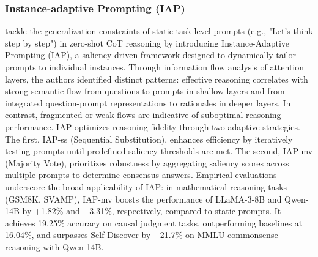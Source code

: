 \documentclass{article}
\begin{document}
\subsubsection{Instance-adaptive Prompting (IAP)}
\label{IAP}
\noindent \citet{yuan2024instanceadaptivezeroshotchainofthoughtprompting} tackle the generalization constraints of static task-level prompts (e.g., "Let’s think step by step") in zero-shot CoT reasoning by introducing Instance-Adaptive Prompting (IAP), a saliency-driven framework designed to dynamically tailor prompts to individual instances. Through information flow analysis of attention layers, the authors identified distinct patterns: effective reasoning correlates with strong semantic flow from questions to prompts in shallow layers and from integrated question-prompt representations to rationales in deeper layers. In contrast, fragmented or weak flows are indicative of suboptimal reasoning performance. IAP optimizes reasoning fidelity through two adaptive strategies. The first, IAP-ss (Sequential Substitution), enhances efficiency by iteratively testing prompts until predefined saliency thresholds are met. The second, IAP-mv (Majority Vote), prioritizes robustness by aggregating saliency scores across multiple prompts to determine consensus answers. Empirical evaluations underscore the broad applicability of IAP: in mathematical reasoning tasks (GSM8K, SVAMP), IAP-mv boosts the performance of LLaMA-3-8B and Qwen-14B by +1.82\% and +3.31\%, respectively, compared to static prompts. It achieves 19.25\% accuracy on causal judgment tasks, outperforming baselines at 16.04\%, and surpasses Self-Discover by +21.7\% on MMLU commonsense reasoning with Qwen-14B.
\end{document}
